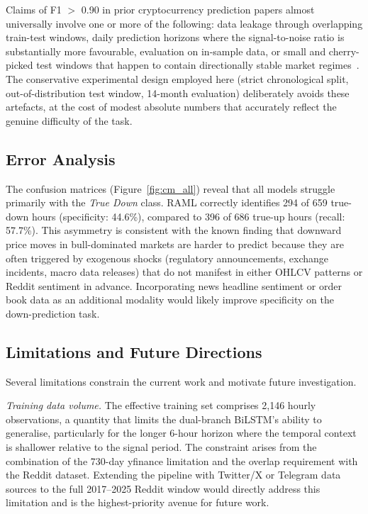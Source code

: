 \documentclass[journal]{IEEEtran}
\newcommand{\raml}{\textsc{RAML}}
\begin{document}
Claims of F1 $>$ 0.90 in prior cryptocurrency prediction papers almost
universally involve one or more of the following: data leakage through
overlapping train-test windows, daily prediction horizons where the
signal-to-noise ratio is substantially more favourable, evaluation on
in-sample data, or small and cherry-picked test windows that happen to
contain directionally stable market regimes~\cite{gu2021regime}. The
conservative experimental design employed here (strict chronological split,
out-of-distribution test window, 14-month evaluation) deliberately avoids
these artefacts, at the cost of modest absolute numbers that accurately
reflect the genuine difficulty of the task.

\subsection{Error Analysis}
The confusion matrices (Figure~\ref{fig:cm_all}) reveal that all models
struggle primarily with the \textit{True Down} class. \raml{} correctly
identifies 294 of 659 true-down hours (specificity: 44.6\%), compared to
396 of 686 true-up hours (recall: 57.7\%). This asymmetry is consistent
with the known finding that downward price moves in bull-dominated markets
are harder to predict because they are often triggered by exogenous shocks
(regulatory announcements, exchange incidents, macro data releases) that do
not manifest in either OHLCV patterns or Reddit sentiment in advance.
Incorporating news headline sentiment or order book data as an additional
modality would likely improve specificity on the down-prediction task.

\subsection{Limitations and Future Directions}
Several limitations constrain the current work and motivate future investigation.

\textit{Training data volume.}
The effective training set comprises 2,146 hourly observations, a quantity
that limits the dual-branch BiLSTM's ability to generalise, particularly
for the longer 6-hour horizon where the temporal context is shallower
relative to the signal period. The constraint arises from the combination
of the 730-day yfinance limitation and the overlap requirement with the
Reddit dataset. Extending the pipeline with Twitter/X or Telegram data
sources to the full 2017--2025 Reddit window would directly address this
limitation and is the highest-priority avenue for future work.
\end{document}
